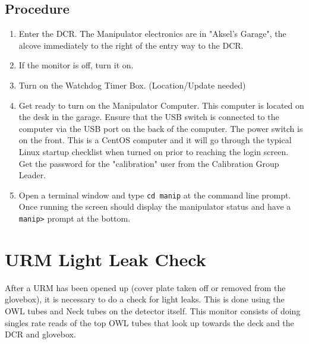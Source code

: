 \documentclass[11pt]{article}
\begin{document}
\subsection{Procedure}
\begin{enumerate}
\item \CheckBox[name=ms1]{} Enter the DCR. The Manipulator electronics are in "Aksel's Garage", the alcove immediately to the right of the entry way to the DCR.
\item \CheckBox[name=ms2]{} If the monitor is off, turn it on.
\item \CheckBox[name=ms4]{} Turn on the Watchdog Timer Box. (Location/Update needed)
\item \CheckBox[name=ms5]{} Get ready to turn on the Manipulator Computer. This computer is located on the desk in the garage. Ensure that the USB switch is connected to the computer via the USB port on the back of the computer. The power switch is on the front. This is a CentOS computer and it will go through the typical Linux startup checklist when turned on prior to reaching the login screen. Get the password for the "calibration" user from the Calibration Group Leader.
\item \CheckBox[name=ms6]{} Open a terminal window and type \verb+cd manip+ at the command line prompt. Once running the screen should display the manipulator status and have a \verb+manip>+ prompt at the bottom.
\end{enumerate}
\section{URM Light Leak Check}\label{sec:ullc}

  After a URM has been opened up (cover plate taken off or removed
from the  glovebox), it is necessary to do a check for light  leaks.
This is done using the OWL tubes and Neck tubes on the detector
itself.  This monitor consists of doing singles rate reads of the
top OWL tubes that look up towards the deck and the DCR and 
glovebox.  
\end{document}
